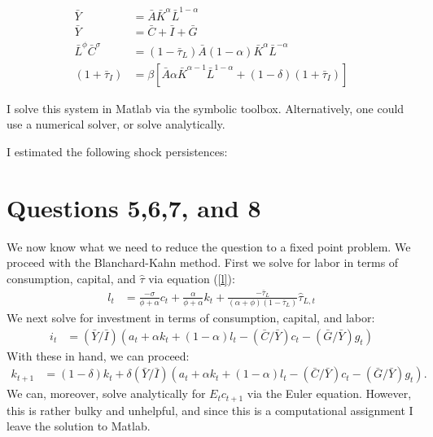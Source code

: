 \documentclass[11pt]{article} %
\begin{document}
\begin{align*}
\bar{Y} &= \bar{A}\bar{K}^{\alpha}\bar{L}^{1-\alpha} \\
\bar{Y} &= \bar{C} + \bar{I} + \bar{G}\\
\bar{L}^{\phi}\bar{C}^{\sigma} &= (1-\bar{\tau}_{L})\bar{A}(1-\alpha) \bar{K}^{\alpha}\bar{L}^{-\alpha} \\
(1+\bar{\tau}_{I}) &= \beta [\bar{A}\alpha \bar{K}^{\alpha-1}\bar{L}^{1-\alpha} + (1-\delta)(1+\bar{\tau}_{I})]
\end{align*}

I solve this system in Matlab via the symbolic toolbox. Alternatively, one could use a numerical solver, or solve analytically.


I estimated the following shock persistences:

\begin{center}

\end{center}

\section{Questions 5,6,7, and 8}
We now know what we need to reduce the question to a fixed point problem. We proceed with the Blanchard-Kahn method. First we solve for labor in terms of consumption, capital, and $\hat{\tau}$ via equation (\ref{l}):
\begin{align*}
l_t &= \frac{-\sigma}{\phi + \alpha}c_t + \frac{\alpha}{\phi + \alpha}k_t +  \frac{-\bar{\tau}_{L}}{(\alpha + \phi)(1-\bar{\tau}_{L})}\hat{\tau}_{L,t}
\end{align*}
We next solve for investment in terms of consumption, capital, and labor:
\begin{align*}
i_t &= (\bar{Y}/\bar{I})(a_t + \alpha k_t + (1-\alpha)l_t  -   (\bar{C}/\bar{Y})c_t -  (\bar{G}/\bar{Y})g_t)
\end{align*}
With these in hand, we can proceed:
\begin{align*}
k_{t+1} &= (1-\delta)k_t + \delta  (\bar{Y}/\bar{I})(a_t + \alpha k_t + (1-\alpha)l_t  -   (\bar{C}/\bar{Y})c_t -  (\bar{G}/\bar{Y})g_t).
\end{align*}
We can, moreover, solve analytically for $E_tc_{t+1}$ via the Euler equation. However, this is rather bulky and unhelpful, and since this is a computational assignment I leave the solution to Matlab.
\end{document}
